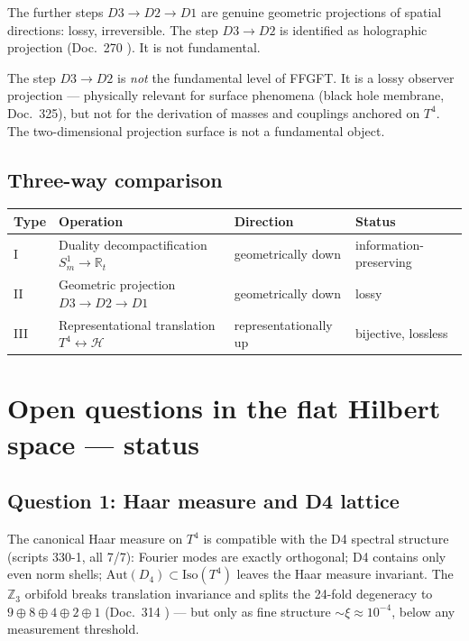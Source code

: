 The further steps $D3\to D2\to D1$ are genuine geometric
projections of spatial directions: lossy, irreversible.
The step $D3\to D2$ is identified as holographic projection
(Doc.~270 \K). It is not fundamental.

\begin{tcolorbox}[ffgftbox,title={Classification of the holographic step}]
  The step $D3\to D2$ is \emph{not} the fundamental level of FFGFT.
  It is a lossy observer projection — physically relevant for
  surface phenomena (black hole membrane, Doc.~325), but not
  for the derivation of masses and couplings anchored on $T^4$.
  The two-dimensional projection surface is not a fundamental object.
\end{tcolorbox}

\subsection{Three-way comparison}

\begin{table}[h!]\small
\begin{tabular}{@{}llll@{}}
\toprule
Type & Operation & Direction & Status \\
\midrule
I   & Duality decompactification $S^1_m\to\mathbb{R}_t$
    & geometrically down & information-preserving \K \\
II  & Geometric projection $D3\to D2\to D1$
    & geometrically down & lossy \K \\
III & Representational translation $T^4\leftrightarrow\mathcal{H}$
    & representationally up & bijective, lossless \K \\
\bottomrule
\end{tabular}
\end{table}

\section{Open questions in the flat Hilbert space — status}
\label{sec:hilbert}

\subsection{Question 1: Haar measure and D4 lattice \B}

The canonical Haar measure on $T^4$ is compatible with the D4
spectral structure (scripts 330-1, all 7/7):
Fourier modes are exactly orthogonal; D4 contains only even norm
shells; $\text{Aut}(D_4)\subset\text{Iso}(T^4)$ leaves the Haar
measure invariant. The $\mathbb{Z}_3$ orbifold breaks translation
invariance and splits the 24-fold degeneracy to $9\oplus8\oplus4\oplus2\oplus1$
(Doc.~314 \K) — but only as fine structure $\sim\xi\approx10^{-4}$,
below any measurement threshold. \B

